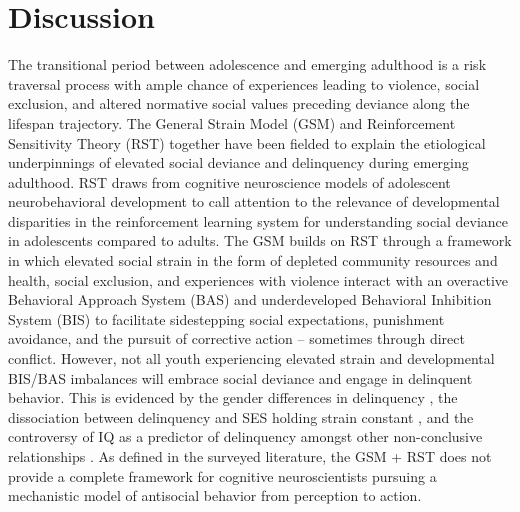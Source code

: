 \documentclass[utf8]{article}
\begin{document}
\section*{Discussion} 
The transitional period between adolescence and emerging adulthood is a risk traversal process with ample chance of experiences leading to violence, social exclusion, and altered normative social values preceding deviance along the lifespan trajectory. The General Strain Model (GSM) and Reinforcement Sensitivity Theory (RST) together have been fielded to explain the etiological underpinnings of elevated social deviance and delinquency during emerging adulthood. RST draws from cognitive neuroscience models of adolescent neurobehavioral development to call attention to the relevance of developmental disparities in the reinforcement learning system for understanding social deviance in adolescents compared to adults. The GSM builds on RST through a framework in which elevated social strain in the form of depleted community resources and health, social exclusion, and experiences with violence interact with an overactive Behavioral Approach System (BAS) and underdeveloped Behavioral Inhibition System (BIS) to facilitate sidestepping social expectations, punishment avoidance, and the pursuit of corrective action -- sometimes through direct conflict. However, not all youth experiencing elevated strain and developmental BIS/BAS imbalances will embrace social deviance and engage in delinquent behavior. This is evidenced by the gender differences in delinquency \citep{mazerolle1998gender}, the dissociation between delinquency and SES holding strain constant \citep{wright1999reconsidering}, and the controversy of IQ as a predictor of delinquency \citep{menard1984structuralist} amongst other non-conclusive relationships \citep{felson2015group}. As defined in the surveyed literature, the GSM + RST does not provide a complete framework for cognitive neuroscientists pursuing a mechanistic model of antisocial behavior from perception to action.
%
\end{document}
